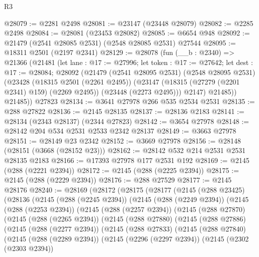 \begin{lexlean}{R3}
\begin{coremodule}
@28079 := @2281 @2498
@28081 := @23147 (@23448 @28079)
@28082 := @2285 @2498
@28084 := @28081 (@23453 @28082)
@28085 := @6654 @948
@28092 := @21479 (@2541 @28085 @2531) (@2548 @28085 @2531) @27544
@28095 := @18311 @2501 (@2197 @2341)
@28129 := @28078
    (fun (__b : @2340) =>
    @21366
      (@21481
        (let lane : @17 := @27996;
        let token : @17 := @27642;
        let dest : @17 := @28084;
        @28092
          (@21479
            (@2541 @28095 @2531)
            (@2548 @28095 @2531)
            (@23428
              (@18315 @2501 (@2261 @2495))
              (@23147 (@18315 (@27279 (@2201 @2341) @159) (@2269 @2495)) (@23448 (@2273 @2495)))
              @2147)
            @21485))
        @21485))
    @27823
@28134 := @3641 @27978 @266 @535 @2534 @2531
@28135 := @288 @27822
@28136 := @2145 @28135
@28137 := @28136 @2183
@28141 := @28134 (@2343 @28137) (@2344 @27823)
@28142 := @3654 @27978
@28148 := @28142 @204 @534 @2531 @2533 @2342 @28137
@28149 := @3663 @27978
@28151 := @28149 @23 @2342
@28152 := @3669 @27978
@28156 := @28148 (@28151 (@3668 (@28152 @23)))
@28162 := @28142 @532 @214 @2531 @2531 @28135 @2183
@28166 := @17393 @27978 @177 @2531 @192
@28169 := @2145 (@288 (@2221 @2394))
@28172 := @2145 (@288 (@2225 @2394))
@28175 := @2145 (@288 (@2229 @2394))
@28176 := @288 @27529
@28177 := @2145 @28176
@28240 := @28169
    (@28172
      (@28175
        (@28177
          (@2145
            (@288 @23425)
            (@28136
              (@2145
                (@288 (@2245 @2394))
                (@2145
                  (@288 (@2249 @2394))
                  (@2145
                    (@288 (@2253 @2394))
                    (@2145
                      (@288 (@2257 @2394))
                      (@2145
                        (@288 @27870)
                        (@2145
                          (@288 (@2265 @2394))
                          (@2145
                            (@288 @27880)
                            (@2145
                              (@288 @27886)
                              (@2145
                                (@288 (@2277 @2394))
                                (@2145
                                  (@288 @27833)
                                  (@2145
                                    (@288 @27840)
                                    (@2145
                                      (@288 (@2289 @2394))
                                      (@2145
                                        (@2296 (@2297 @2394))
                                        (@2145
                                          (@2302 (@2303 @2394))

\end{coremodule}
\end{lexlean}
